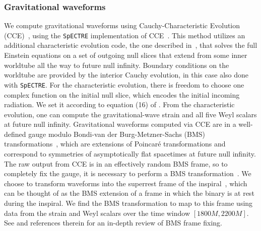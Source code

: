 \begin{bibunit}[unsrtnat]
\subsubsection{Gravitational waveforms\label{sec:gws}}
We compute gravitational waveforms using Cauchy-Characteristic Evolution
(CCE)~\cite{1996PhRvD..54.6153B,2016LRR....19....2B, 2016CQGra..33v5007H,
2020PhRvD.102b4004B, 2020PhRvD.102d4052M}, using the \texttt{SpECTRE}
implementation of CCE~\cite{Moxon:2021gbv}. This method utilizes an additional
characteristic evolution code, the one described in~\cite{Moxon:2021gbv}, that
solves the full Einstein equations on a set of outgoing null slices that extend
from some inner worldtube all the way to future null infinity.  Boundary
conditions on the worldtube are provided by the interior Cauchy evolution, in
this case also done with \texttt{SpECTRE}.  For the characteristic evolution,
there is freedom to choose one complex function on the initial null slice, which
encodes the initial incoming radiation. We set it according to equation (16) of
\cite{Moxon:2021gbv}. From the characteristic evolution, one can compute the
gravitational-wave strain and all five Weyl scalars at future null infinity.
Gravitational waveforms computed via CCE are in a well-defined gauge modulo
Bondi-van der Burg-Metzner-Sachs (BMS)
transformations~\cite{Bondi:1962px,Sachs:1962wk}, which are extensions of
Poincar\'e transformations and correspond to symmetries of asymptotically flat
spacetimes at future null infinity. The raw output from CCE is in an effectively
random BMS frame, so to completely fix the gauge, it is necessary to perform a
BMS transformation~\cite{Mitman:2024uss}.  We choose to transform waveforms into
the superrest frame of the inspiral~\cite{Mitman:2021xkq,Mitman:2022kwt}, which
can be thought of as the BMS extension of a frame in which the binary is at rest
during the inspiral. We find the BMS transformation to map to this frame using
data from the strain and Weyl scalars over the time window $[1800M,2200M]$. See
\cite{Mitman:2024uss} and references therein for an in-depth review of BMS frame
fixing.


\end{bibunit}
